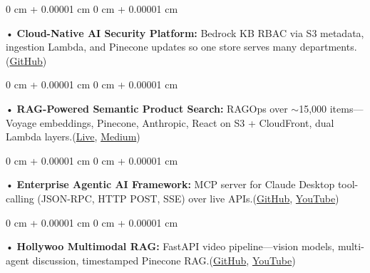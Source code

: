 \documentclass[10pt, letterpaper]{article}
\newenvironment{onecolentry}{
    \begin{adjustwidth}{
        0 cm + 0.00001 cm
    }{
        0 cm + 0.00001 cm
    }
}{
    \end{adjustwidth}
} %
\begin{document}
\begin{onecolentry}
     • \textbf{Cloud-Native AI Security Platform:} Bedrock KB RBAC via S3 metadata, ingestion Lambda, and Pinecone updates so one store serves many departments.(\href{https://github.com/daedalus-s/bedrock-acl-metadata}{GitHub})
\end{onecolentry}
\begin{onecolentry}
     • \textbf{RAG-Powered Semantic Product Search:} RAGOps over $\sim$15,000 items---Voyage embeddings, Pinecone, Anthropic, React on S3 + CloudFront, dual Lambda layers.(\href{https://prorecsa.co}{Live}, \href{https://medium.com/@sreenikethaathreya/from-rags-to-riches-bba8a671d5e6}{Medium})
\end{onecolentry}
\begin{onecolentry}
     • \textbf{Enterprise Agentic AI Framework:} MCP server for Claude Desktop tool-calling (JSON-RPC, HTTP POST, SSE) over live APIs.(\href{https://github.com/daedalus-s/dota2-mcp-server}{GitHub}, \href{https://www.youtube.com/watch?v=op2gTYyFb5U}{YouTube})
\end{onecolentry}
\begin{onecolentry}
     • \textbf{Hollywoo Multimodal RAG:} FastAPI video pipeline---vision models, multi-agent discussion, timestamped Pinecone RAG.(\href{https://github.com/daedalus-s/fireworks-video-discussion}{GitHub}, \href{https://www.youtube.com/watch?v=KBs_3V0OAgU}{YouTube})
\end{onecolentry}
\vspace{2 pt}
        \vspace{2 pt }
\end{document}

